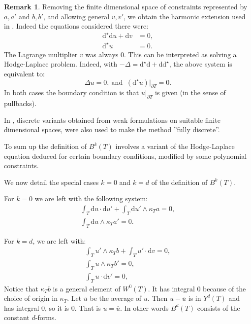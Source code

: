 \documentclass[10pt,a4paper]{article}
\newcommand{\rmd}{\mathrm{d}}
\theoremstyle{remark}
\theoremstyle{definition}
\newtheorem{remark}{Remark}[section]
\numberwithin{equation}{section}
\begin{document}
\begin{remark}
Removing the finite dimensional space of constraints represented by $a,a'$ and $b,b'$, and allowing general $v,v'$, we obtain the harmonic extension used in \cite{Chr08M3AS}. Indeed the equations considered there were:
\begin{align}
  \rmd^\star \rmd u + \rmd v & = 0,\\
  \rmd^\star u & = 0.
\end{align}
The Lagrange multiplier $v$ was always $0$. This can be interpreted as solving a Hodge-Laplace problem. Indeed, with $-\Delta = \rmd^\star \rmd + \rmd \rmd^\star$, the above system is equivalent to:
\begin{equation}
  \Delta u = 0,\ \textrm{and }\ (\rmd^\star u) |_{\partial T} = 0.
\end{equation}
In both cases the boundary condition is that $u|_{\partial T}$ is given (in the sense of pullbacks).

In \cite{Chr08M3AS}, discrete variants obtained from weak formulations on suitable finite dimensional spaces, were also used to make the method ''fully discrete''.

To sum up the definition of $B^k (T)$ involves a variant of the Hodge-Laplace equation deduced for certain boundary conditions, modified by some polynomial constraints.
\end{remark}

We now detail the special cases $k=0$ and $k=d$ of the definition of $B^k(T)$.

\noindent For $k= 0$ we are left with the following system:
 \begin{align}
  \int_T \rmd u \cdot \rmd u' + \int_T \rmd u' \wedge \kappa_T a = 0,\\
  \int_T \rmd u \wedge \kappa_T a' = 0.
\end{align} 

\noindent For $k=d$, we are left with:
\begin{align}
  \int_T u' \wedge \kappa_T b + \int_T u' \cdot \rmd v = 0,\\
  \int_T u \wedge \kappa_T b' = 0 ,\\
  \int_T u \cdot \rmd v' = 0,
\end{align}
Notice that $\kappa_T b$ is a general element of $W^0(T)$. It has integral $0$ because of the choice of origin in $\kappa_T$. Let $\overline u$ be the average of $u$. Then $u-\overline u$ is in $Y^d(T)$ and has integral $0$, so it is $0$. That is $u = \overline u$. In other words $B^d(T)$ consists of the constant $d$-forms.
\end{document}
